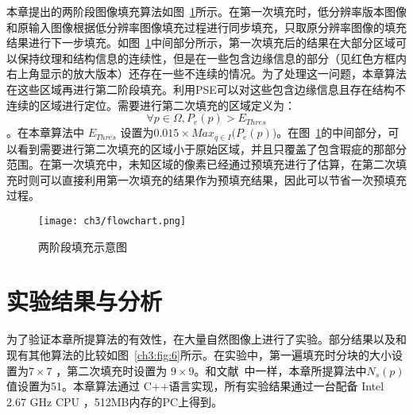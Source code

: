 本章提出的两阶段图像填充算法如图~\ref{ch3:fig:5}所示。在第一次填充时，低分辨率版本图像和原输入图像根据低分辨率图像填充过程进行同步填充，只取原分辨率图像的填充结果进行下一步填充。如图~\ref{ch3:fig:5}中间部分所示，第一次填充后的结果在大部分区域可以保持纹理和结构信息的连续性，但是在一些包含边缘信息的部分（见红色方框内右上角显示的放大版本）还存在一些不连续的情况。为了处理这一问题，本章算法在这些区域再进行第二阶段填充。利用PSE可以对这些包含边缘信息且存在结构不连续的区域进行定位。需要进行第二次填充的区域定义为： $$\forall p \in \Omega, P_e(p)>E_{Thres}$$。在本章算法中 \(E_{Thres}\) 设置为\(0.015 \times Max_{q\in{I}}{(P_e(p)})\)。在图~\ref{ch3:fig:5}的中间部分，可以看到需要进行第二次填充的区域小于原始区域，并且只覆盖了包含瑕疵的那部分范围。在第一次填充中，未知区域的像素已经通过预填充进行了估算，在第二次填充时则可以直接利用第一次填充的结果作为预填充结果，因此可以节省一次预填充过程。

\begin{figure}[!htbp]
\begin{center}
  \texttt{[image: ch3/flowchart.png]}
\end{center}
\caption{两阶段填充示意图}
\label{ch3:fig:5}       %
\end{figure}

 \section{实验结果与分析}
 \label{cha3:results}
为了验证本章所提算法的有效性，在大量自然图像上进行了实验。部分结果以及和现有其他算法\cite{Criminisi04regionfilling,Xu:2010}的比较如图~\ref{ch3:fig:6}所示。在实验中，第一遍填充时分块的大小设置为\(7\times7\) ，第二次填充时设置为 \(9\times9\)。和文献~中一样，本章所提算法中\(N_s(p)\)值设置为51。本章算法通过 C++语言实现，所有实验结果通过一台配备  Intel 2.67 GHz CPU ，512MB内存的PC上得到。\par


